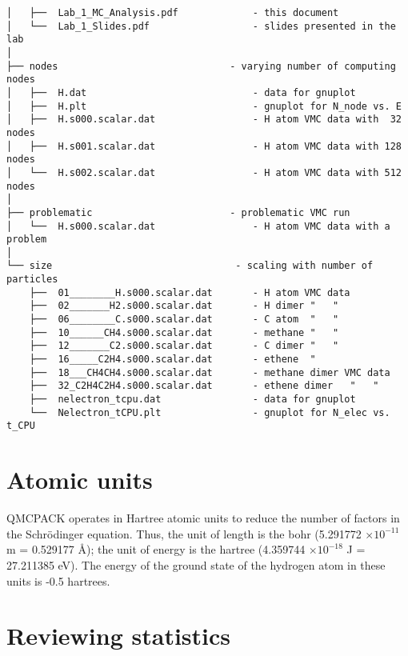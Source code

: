 \begin{verbatim}
│   ├──  Lab_1_MC_Analysis.pdf             - this document
│   └──  Lab_1_Slides.pdf                  - slides presented in the lab
│
├── nodes                              - varying number of computing nodes
│   ├──  H.dat                             - data for gnuplot
│   ├──  H.plt                             - gnuplot for N_node vs. E
│   ├──  H.s000.scalar.dat                 - H atom VMC data with  32 nodes
│   ├──  H.s001.scalar.dat                 - H atom VMC data with 128 nodes
│   └──  H.s002.scalar.dat                 - H atom VMC data with 512 nodes
│
├── problematic                        - problematic VMC run
│   └──  H.s000.scalar.dat                 - H atom VMC data with a problem
│
└── size                                - scaling with number of particles
    ├──  01________H.s000.scalar.dat       - H atom VMC data
    ├──  02_______H2.s000.scalar.dat       - H dimer "   "
    ├──  06________C.s000.scalar.dat       - C atom  "   "
    ├──  10______CH4.s000.scalar.dat       - methane "   "
    ├──  12_______C2.s000.scalar.dat       - C dimer "   "
    ├──  16_____C2H4.s000.scalar.dat       - ethene  " 
    ├──  18___CH4CH4.s000.scalar.dat       - methane dimer VMC data
    ├──  32_C2H4C2H4.s000.scalar.dat       - ethene dimer   "   "
    ├──  nelectron_tcpu.dat                - data for gnuplot
    └──  Nelectron_tCPU.plt                - gnuplot for N_elec vs. t_CPU
\end{verbatim}
\normalsize

\section{Atomic units} 

QMCPACK operates in Hartree atomic units to reduce the
number of factors in the Schr\"odinger equation.  Thus, the unit of length is
the bohr (5.291772 $\times 10^{-11}$ m = 0.529177 \AA); the unit of energy is
the hartree (4.359744 $\times 10^{-18}$ J = 27.211385 eV).  The energy of the
ground state of the hydrogen atom in these units is -0.5 hartrees.



\section{Reviewing statistics}
\label{sec:review}

